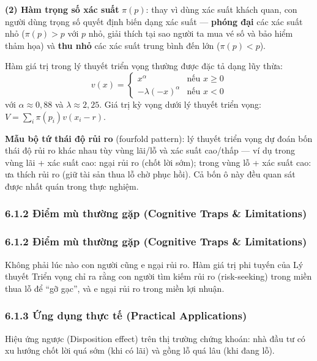 \documentclass[
]{article}
\begin{document}
\textbf{(2) Hàm trọng số xác suất} \(\pi(p)\): thay vì dùng xác suất
khách quan, con người dùng trọng số quyết định biến dạng xác suất ---
\textbf{phóng đại} các xác suất nhỏ (\(\pi(p) > p\) với \(p\) nhỏ, giải
thích tại sao người ta mua vé số và bảo hiểm thảm họa) và \textbf{thu
nhỏ} các xác suất trung bình đến lớn (\(\pi(p) < p\)).

Hàm giá trị trong lý thuyết triển vọng thường được đặc tả dạng lũy thừa:
\[ v(x) = \begin{cases} x^\alpha & \text{nếu } x \ge 0 \\ -\lambda(-x)^\alpha & \text{nếu } x < 0 \end{cases} \]
với \(\alpha \approx 0{,}88\) và \(\lambda \approx 2{,}25\). Giá trị kỳ
vọng dưới lý thuyết triển vọng: \(V = \sum_i \pi(p_i) v(x_i - r)\).

\textbf{Mẫu bộ tứ thái độ rủi ro} (fourfold pattern): lý thuyết triển
vọng dự đoán bốn thái độ rủi ro khác nhau tùy vùng lãi/lỗ và xác suất
cao/thấp --- ví dụ trong vùng lãi + xác suất cao: ngại rủi ro (chốt lời
sớm); trong vùng lỗ + xác suất cao: ưa thích rủi ro (giữ tài sản thua lỗ
chờ phục hồi). Cả bốn ô này đều quan sát được nhất quán trong thực
nghiệm.

\subsubsection{6.1.2 Điểm mù thường gặp (Cognitive Traps \&
Limitations)}\label{ux111iux1ec3m-muxf9-thux1b0ux1eddng-gux1eb7p-cognitive-traps-limitations-15}

\subsubsection{6.1.2 Điểm mù thường gặp (Cognitive Traps \&
Limitations)}\label{ux111iux1ec3m-muxf9-thux1b0ux1eddng-gux1eb7p-cognitive-traps-limitations-16}

Không phải lúc nào con người cũng e ngại rủi ro. Hàm giá trị phi tuyến
của Lý thuyết Triển vọng chỉ ra rằng con người tìm kiếm rủi ro
(risk-seeking) trong miền thua lỗ để ``gỡ gạc'', và e ngại rủi ro trong
miền lợi nhuận.

\subsubsection{6.1.3 Ứng dụng thực tế (Practical
Applications)}\label{ux1ee9ng-dux1ee5ng-thux1ef1c-tux1ebf-practical-applications-9}

Hiệu ứng ngược (Disposition effect) trên thị trường chứng khoán: nhà đầu
tư có xu hướng chốt lời quá sớm (khi có lãi) và gồng lỗ quá lâu (khi
đang lỗ).
\end{document}
